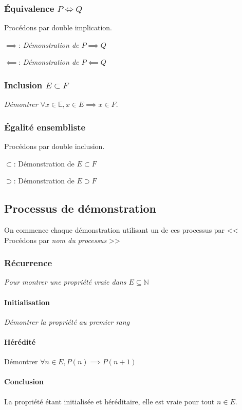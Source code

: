 \documentclass{article}
\newcommand{\N}{{\mathbb N}}
\begin{document}
\subsubsection{Équivalence $P \iff Q$}
Procédons par double implication.

$\implies$: \emph{Démonstration de $P \implies Q$} 

$\impliedby$: \emph{Démonstration de $P \impliedby Q$} 

\subsubsection{Inclusion $E \subset F$}
\emph{Démontrer $\forall x \in \mathbb{E}, x \in E \implies x \in F$}.

\subsubsection{Égalité ensembliste}
Procédons par double inclusion.

$\subset$: Démonstration de $E \subset F$

$\supset$: Démonstration de $E \supset F$


\subsection{Processus de démonstration}
On commence chaque démonstration utilisant un de ces processus par << Procédons par \emph{nom du processus}  >> 

\subsubsection{Récurrence}
\emph{Pour montrer une propriété vraie dans $E \subseteq \N$} 

\paragraph{Initialisation}
\emph{Démontrer la propriété au premier rang} 

\paragraph{Hérédité}
Démontrer $\forall n \in E, P(n) \implies P(n+1)$

\paragraph{Conclusion}
La propriété étant initialisée et héréditaire, elle est vraie pour tout $n \in E$.
\end{document}

